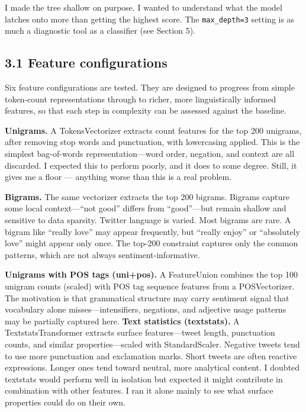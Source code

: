 \documentclass[12pt]{article}
\begin{document}
I made the tree shallow on purpose.
I wanted to understand what the model latches onto more than getting the highest score.
The \texttt{max\_depth=3} setting is as much a diagnostic tool as a classifier (see Section 5).



\subsection*{3.1 Feature configurations}



Six feature configurations are tested. They are designed to progress from simple token-count representations through to richer, more linguistically informed features, so that each step in complexity can be assessed against the baseline.

\textbf{Unigrams.} A TokensVectorizer extracts count features for the top 200 unigrams, after removing stop words and punctuation, with lowercasing applied. This is the simplest bag-of-words representation---word order, negation, and context are all discarded. I expected this to perform poorly, and it does to some degree. Still, it gives me a floor --- anything worse than this is a real problem.

\textbf{Bigrams.} The same vectorizer extracts the top 200 bigrams. Bigrams capture some local context---``not good'' differs from ``good''---but remain shallow and sensitive to data sparsity. Twitter language is varied. Most bigrams are rare. A bigram like ``really love'' may appear frequently, but ``really enjoy'' or ``absolutely love'' might appear only once. The top-200 constraint captures only the common patterns, which are not always sentiment-informative.

\textbf{Unigrams with POS tags (uni+pos).} A FeatureUnion combines the top 100 unigram counts (scaled) with POS tag sequence features from a POSVectorizer. The motivation is that grammatical structure may carry sentiment signal that vocabulary alone misses---intensifiers, negations, and adjective usage patterns may be partially captured here. 
\textbf{Text statistics (textstats).} A TextstatsTransformer extracts surface features---tweet length, punctuation counts, and similar properties---scaled with StandardScaler. Negative tweets tend to use more punctuation and exclamation marks. Short tweets are often reactive expressions. Longer ones tend toward neutral, more analytical content. I doubted textstats would perform well in isolation but expected it might contribute in combination with other features. I ran it alone mainly to see what surface properties could do on their own.
\end{document}
